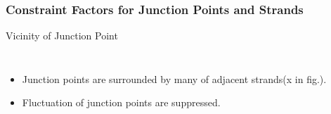 \documentclass[aspectratio=169,11pt, dvipdfmx]{beamer}
\begin{document}
\begin{frame}
	\frametitle{Constraint Factors for Junction Points and Strands}
		\vspace{-2mm}
		\begin{alertblock}{Vicinity of Junction Point}
			\begin{columns}[totalwidth=1\textwidth]
				\vspace{-3mm}
				\begin{itemize}
					\item Junction points are surrounded by many of \alert{adjacent strands(x in fig.).}
					\item %
					Fluctuation of junction points are \alert{suppressed}. 
				\end{itemize}


\end{columns}
\end{alertblock}
\end{frame}
\end{document}
